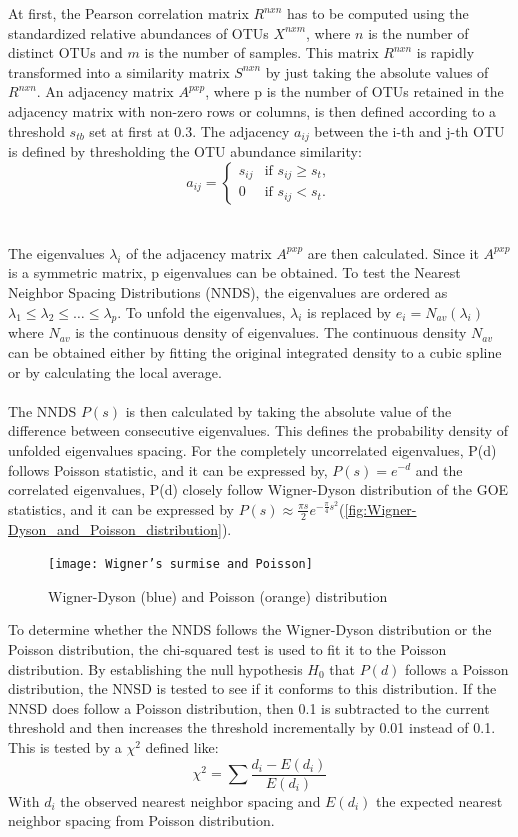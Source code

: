 At first, the Pearson correlation matrix $R^{nxn}$ has to be computed using the standardized relative abundances of OTUs $X^{nxm}$, where $n$ is the number of distinct OTUs and $m$ is the number of samples.
This matrix $R^{nxn}$ is rapidly transformed into a similarity matrix $S^{nxn}$ by just taking the absolute values of $R^{nxn}$.
An adjacency matrix $A^{pxp}$, where p is the number of OTUs retained in the adjacency matrix with non-zero rows or columns, is then defined according to a threshold $s_{tb}$ set at first at 0.3.
The adjacency $a_{ij}$ between the i-th and j-th OTU is defined by thresholding the OTU abundance similarity:
\[a_{ij} =
\begin{cases}
s_{ij} & \text{if } s_{ij} \geq s_t, \\
0 & \text{if } s_{ij} < s_t.
\end{cases}\]
\\\\
\noindent The eigenvalues $\lambda_i$ of the adjacency matrix $A^{pxp}$ are then calculated.
Since it $A^{pxp}$ is a symmetric matrix, p eigenvalues can be obtained.
To test the Nearest Neighbor Spacing Distributions (NNDS), the eigenvalues are ordered as $\lambda_1 \leq \lambda_2 \leq \ldots \leq \lambda_p$.
To unfold the eigenvalues, $\lambda_i$ is replaced by $e_i = N_{av}(\lambda_i)$ where $N_{av}$ is the continuous density of eigenvalues.
The continuous density $N_{av}$ can be obtained either by fitting the original integrated density to a cubic spline or by calculating the local average.
\\\\
The NNDS $P(s)$ is then calculated by taking the absolute value of the difference between consecutive eigenvalues.
This defines the probability density of unfolded eigenvalues spacing.
For the completely uncorrelated eigenvalues, P(d) follows Poisson statistic, and it can be expressed by, $P(s)=e^{-d}$ and the correlated eigenvalues, P(d) closely follow Wigner-Dyson distribution of the GOE statistics, and it can be expressed by $P(s) \approx \frac{\pi s}{2}e^{-\frac{\pi}{4}s^2}$(\autoref{fig:Wigner-Dyson_and_Poisson_distribution}).

\begin{figure}[H]
    \centering
    \texttt{[image: Wigner’s surmise and Poisson]} %
    \caption{Wigner-Dyson (blue) and Poisson (orange) distribution}
    \label{fig:Wigner-Dyson_and_Poisson_distribution}
\end{figure}

To determine whether the NNDS follows the Wigner-Dyson distribution or the Poisson distribution, the chi-squared test is used to fit it to the Poisson distribution.
By establishing the null hypothesis $H_0$ that $P(d)$ follows a Poisson distribution, the NNSD is tested to see if it conforms to this distribution.
If the NNSD does follow a Poisson distribution, then 0.1 is subtracted to the current threshold and then increases the threshold incrementally by 0.01 instead of 0.1.
This is tested by a $\chi^2$ defined like:
\[\chi^2=\sum \frac{d_i-E(d_i)}{E(d_i)}\]
With $d_i$ the observed nearest neighbor spacing and $E(d_i)$ the expected nearest neighbor spacing from Poisson distribution.


